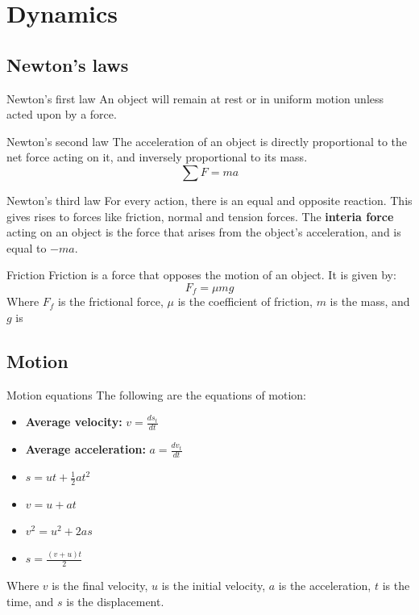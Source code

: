 

\section{Dynamics}

\subsection{Newton's laws}
\begin{definition}
    {Newton's first law}
    An object will remain at rest or in uniform motion unless acted upon by a force.
\end{definition}

\begin{definition}
    {Newton's second law}
    The acceleration of an object is directly proportional to the net force acting on it, and inversely proportional to its mass.
    \[\sum F=ma\]
\end{definition}

\begin{definition}
    {Newton's third law}
    For every action, there is an equal and opposite reaction. This gives rises to forces like friction, normal and tension forces.
    \tcblower
    The \textbf{interia force} acting on an object is the force that arises from the object's acceleration, and is equal to $-ma$.
\end{definition}

\begin{knBox}
    {Friction}
    Friction is a force that opposes the motion of an object. It is given by:
    \[F_f=\mu mg\]
    Where $F_f$ is the frictional force, $\mu$ is the coefficient of friction, $m$ is the mass, and $g$ is
\end{knBox}

\subsection{Motion}
\begin{theorem}
    {Motion equations}
    The following are the equations of motion:
    \begin{itemize}
        \item \textbf{Average velocity: }$v=\frac{ds_t}{dt}$
        \item \textbf{Average acceleration: }$a=\frac{dv_t}{dt}$
        \item $s=ut+\frac{1}{2}at^2$
        \item $v=u+at$
        \item $v^2=u^2+2as$
        \item $s=\frac{(v+u)t}{2}$
    \end{itemize}
    Where $v$ is the final velocity, $u$ is the initial velocity, $a$ is the acceleration, $t$ is the time, and $s$ is the displacement.
\end{theorem}


